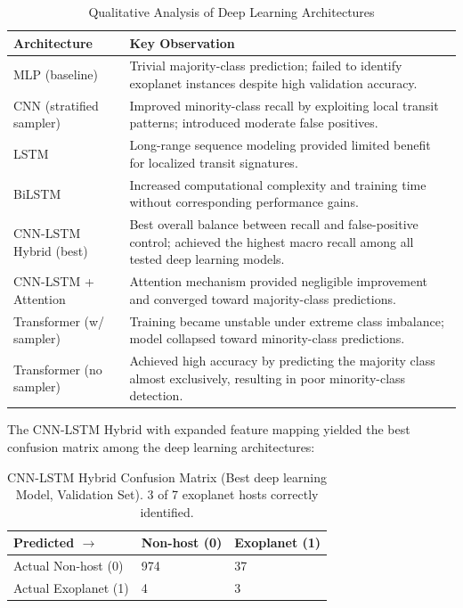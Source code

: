 \documentclass[preprint,11pt,times]{elsarticle}
\begin{document}
\begin{table}[H]
\centering
\caption{Qualitative Analysis of Deep Learning Architectures}
\label{tab6_obs}

\begin{tabular}{p{4cm} p{9cm}}
\toprule
Architecture & Key Observation \\
\midrule

MLP (baseline) &
Trivial majority-class prediction; failed to identify exoplanet instances despite high validation accuracy. \\

CNN (stratified sampler) &
Improved minority-class recall by exploiting local transit patterns; introduced moderate false positives. \\

LSTM &
Long-range sequence modeling provided limited benefit for localized transit signatures. \\

BiLSTM &
Increased computational complexity and training time without corresponding performance gains. \\

CNN-LSTM Hybrid (best) &
Best overall balance between recall and false-positive control; achieved the highest macro recall among all tested deep learning models. \\

CNN-LSTM + Attention &
Attention mechanism provided negligible improvement and converged toward majority-class predictions. \\

Transformer (w/ sampler) &
Training became unstable under extreme class imbalance; model collapsed toward minority-class predictions. \\

Transformer (no sampler) &
Achieved high accuracy by predicting the majority class almost exclusively, resulting in poor minority-class detection. \\

\bottomrule
\end{tabular}
\end{table}

\FloatBarrier
The CNN-LSTM Hybrid with expanded feature mapping yielded the best confusion matrix among the deep learning architectures:

\begin{table}[h]
\caption{CNN-LSTM Hybrid Confusion Matrix (Best deep learning Model, Validation Set). 3 of 7 exoplanet hosts correctly identified.}\label{tab7}%
\begin{tabular}{@{}lll@{}}
\toprule
Predicted $\rightarrow$ & Non-host (0) & Exoplanet (1) \\
\midrule
Actual Non-host (0) & 974 & 37 \\
Actual Exoplanet (1) & 4 & 3 \\
\bottomrule
\end{tabular}
\end{table}
\end{document}

